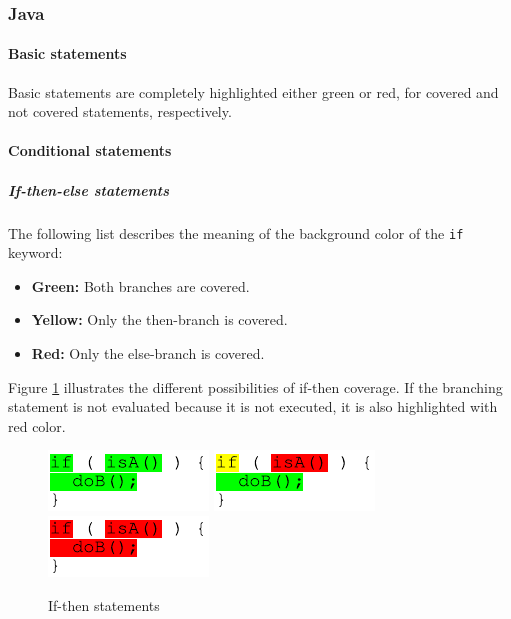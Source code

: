\subsubsection{Java}

\paragraph{Basic statements}
Basic statements are completely highlighted either green or red, for covered and not covered statements, respectively.

\paragraph{Conditional statements}
\subparagraph{If-then-else statements}
The following list describes the meaning of the background color of the \texttt{if} keyword:
\begin{itemize}
\item \textbf{Green:}  Both branches are covered.
\item \textbf{Yellow:}  Only the then-branch is covered.
\item \textbf{Red:}  Only the else-branch is covered.
\end{itemize}
\par
Figure \ref{ui_fg:If-then statements} illustrates the different possibilities of if-then coverage. If the branching statement is not evaluated because it is not executed, it is also highlighted with red color.
\begin{figure}[hbt]
 \hfill
 \includegraphics[]{images/Source_Code_Highlighting/if/if_without_else_green}
 \hfill
 \includegraphics[]{images/Source_Code_Highlighting/if/if_without_else_yellow}
 \hfill
 \includegraphics[]{images/Source_Code_Highlighting/if/if_without_else_red}
 \hspace{1cm}
 \hfill
 \caption{If-then statements}
 \label{ui_fg:If-then statements}
\end{figure}
